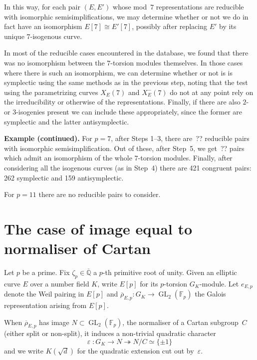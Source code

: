 \documentclass[12pt]{amsart}
\newcommand{\F}{\mathbb{F}}
\newcommand{\Q}{\mathbb{Q}}
\newcommand{\Qbar}{{\overline{\Q}}}
\newcommand{\rhobar}{{\overline{\rho}}}
\newcommand{\eps}{\varepsilon}
\newcommand{\GL}{\operatorname{GL}}
\numberwithin{equation}{section}
\theoremstyle{definition}
\theoremstyle{remark}
\begin{document}

In this way, for each pair $(E,E')$ whose 
mod~$7$ representations
are reducible with isomorphic semisimplifications, we may determine
whether or not we do in fact have an isomorphism $E[7]\cong E'[7]$,
possibly after replacing $E'$ by its unique $7$-isogenous curve.

In most of the reducible cases encountered in the database, we found
that there was no isomorphism between the $7$-torsion modules
themselves.  In those cases where there is such an isomorphism, we can
determine whether or not is is symplectic using the same methods as in
the previous step, noting that the test using the parametrizing curves
$X_E(7)$ and $X_E^-(7)$ do not at any point rely on the irreducibility
or otherwise of the representations.  Finally, if there are also
$2$-{} or $3$-isogenies present we can include these appropriately,
since the former are symplectic and the latter antisymplectic.

{\bf Example (continued).} For $p=7$, after Steps 1--3, there are~?? reducible pairs with isomorphic semisimplification. Out of these, after Step~5, we get~?? pairs which admit
an isomorphism of the whole $7$-torsion modules. 
Finally, after considering all the isogenous curves (as in Step~4) there are 421 congruent pairs: 
262 symplectic and 159 antisymplectic. 

For $p=11$ there are no reducible pairs to consider.

\section{The case of image equal to normaliser of Cartan}

Let $p$ be a prime. Fix $\zeta_p \in \Qbar$ a $p$-th primitive root of
unity.  Given an elliptic curve $E$ over a number field $K$, write
$E[p]$ for its $p$-torsion $G_K$-module. Let $e_{E,p}$ denote the Weil
pairing in $E[p]$ and $\rhobar_{E,p} : G_K \to \GL_2(\F_p)$ the Galois
representation arising from $E[p]$.

When $\rhobar_{E,p}$ has image $N \subset \GL_2(\F_p)$, the normaliser
of a Cartan subgroup~$C$ (either split or non-split), it induces a
non-trivial quadratic character
\[
 \eps \; : G_K \to N \twoheadrightarrow N/C \simeq \{\pm 1 \}
\]
and we write $K(\sqrt{d})$ for the quadratic extension cut out
by~$\eps$.
\end{document}
